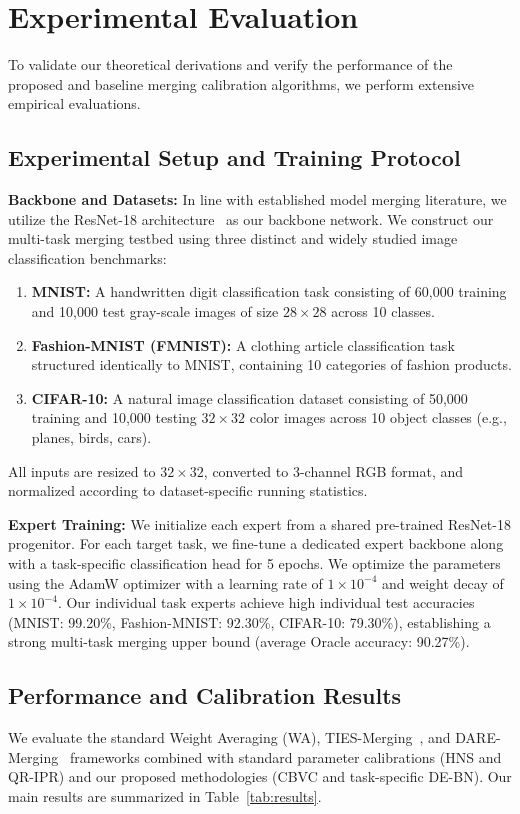\documentclass{article}
\begin{document}
\section{Experimental Evaluation}
\label{sec:experiments}

To validate our theoretical derivations and verify the performance of the proposed and baseline merging calibration algorithms, we perform extensive empirical evaluations.

\subsection{Experimental Setup and Training Protocol}
\label{subsec:setup}
\textbf{Backbone and Datasets:} In line with established model merging literature, we utilize the ResNet-18 architecture~\cite{he2016deep} as our backbone network. We construct our multi-task merging testbed using three distinct and widely studied image classification benchmarks:
\begin{enumerate}
    \item \textbf{MNIST:} A handwritten digit classification task consisting of 60,000 training and 10,000 test gray-scale images of size $28\times28$ across 10 classes.
    \item \textbf{Fashion-MNIST (FMNIST):} A clothing article classification task structured identically to MNIST, containing 10 categories of fashion products.
    \item \textbf{CIFAR-10:} A natural image classification dataset consisting of 50,000 training and 10,000 testing $32\times32$ color images across 10 object classes (e.g., planes, birds, cars).
\end{enumerate}
All inputs are resized to $32\times32$, converted to 3-channel RGB format, and normalized according to dataset-specific running statistics.

\textbf{Expert Training:} We initialize each expert from a shared pre-trained ResNet-18 progenitor. For each target task, we fine-tune a dedicated expert backbone along with a task-specific classification head for 5 epochs. We optimize the parameters using the AdamW optimizer with a learning rate of $1\times 10^{-4}$ and weight decay of $1\times 10^{-4}$. Our individual task experts achieve high individual test accuracies (MNIST: 99.20\%, Fashion-MNIST: 92.30\%, CIFAR-10: 79.30\%), establishing a strong multi-task merging upper bound (average Oracle accuracy: 90.27\%).

\subsection{Performance and Calibration Results}
We evaluate the standard Weight Averaging (WA), TIES-Merging~\cite{yadav2023ties}, and DARE-Merging~\cite{yu2024dare} frameworks combined with standard parameter calibrations (HNS and QR-IPR) and our proposed methodologies (CBVC and task-specific DE-BN). Our main results are summarized in Table~\ref{tab:results}.
\end{document}
